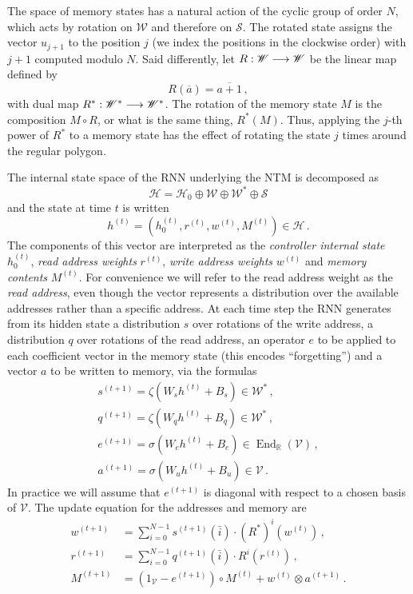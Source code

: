 \documentclass[english,letter paper,12pt,leqno]{article}
\theoremstyle{example}
\numberwithin{equation}{section}
\def\be{\begin{equation}}
\def\ee{\end{equation}}
\DeclareMathOperator{\End}{End}
\begin{document}
The space of memory states has a natural action of the cyclic group of order $N$, which acts by rotation on $\mathscr{W}$ and therefore on $\mathscr{S}$. The rotated state assigns the vector $u_{j+1}$ to the position $j$ (we index the positions in the clockwise order) with $j + 1$ computed modulo $N$. Said differently, let $R: \mathscr{W} \longrightarrow \mathscr{W}$ be the linear map defined by
\[
R( \overline{a} ) = \overline{a+1}\,,
\]
with dual map $R^*: \mathscr{W}^* \longrightarrow \mathscr{W}^*$. The rotation of the memory state $M$ is the composition $M \circ R$, or what is the same thing, $R^*( M )$. Thus, applying the $j$-th power of $R^*$ to a memory state has the effect of rotating the state $j$ times around the regular polygon.

The internal state space of the RNN underlying the NTM is decomposed as
\be\label{eq:decomp}
\mathscr{H} = \mathscr{H}_0 \oplus \mathscr{W} \oplus \mathscr{W}^* \oplus \mathscr{S}
\ee
and the state at time $t$ is written
\[
h^{(t)} = (h_0^{(t)}, r^{(t)}, w^{(t)}, M^{(t)}) \in \mathscr{H}\,.
\]
The components of this vector are interpreted as the \emph{controller internal state} $h_0^{(t)}$, \emph{read address weights} $r^{(t)}$, \emph{write address weights} $w^{(t)}$ and \emph{memory contents} $M^{(t)}$. For convenience we will refer to the read address weight as the \emph{read address}, even though the vector represents a distribution over the available addresses rather than a specific address. At each time step the RNN generates from its hidden state a distribution $s$ over rotations of the write address, a distribution $q$ over rotations of the read address, an operator $e$ to be applied to each coefficient vector in the memory state (this encodes ``forgetting'') and a vector $a$ to be written to memory, via the formulas
\begin{gather*}
s^{(t+1)} = \zeta( W_s h^{(t)} + B_s ) \in \mathscr{W}^*\,,\\
q^{(t+1)} = \zeta( W_q h^{(t)} + B_q ) \in \mathscr{W}^*\,,\\
e^{(t+1)} = \sigma( W_e h^{(t)} + B_e ) \in \End_{\mathbb{R}}(\mathscr{V})\,,\\
a^{(t+1)} = \sigma( W_u h^{(t)} + B_u ) \in \mathscr{V}\,.
\end{gather*}
In practice we will assume that $e^{(t+1)}$ is diagonal with respect to a chosen basis of $\mathscr{V}$. The update equation for the addresses \cite[Eq. (8)]{ntm} and memory \cite[Eq. (3),(4)]{ntm} are
\begin{align}
w^{(t+1)} &= \sum_{i=0}^{N-1} s^{(t+1)}(\bar{i}) \cdot (R^*)^i( w^{(t)} )\,,\label{eq:ntm_update1}
\\
r^{(t+1)} &= \sum_{i=0}^{N-1} q^{(t+1)}(\bar{i}) \cdot R^i( r^{(t)} )\,,\label{eq:ntm_update2}\\
M^{(t+1)} &= (1_{\mathscr{V}} - e^{(t+1)} ) \circ M^{(t)} + w^{(t)} \otimes a^{(t+1)}\,.\label{eq:ntm_update3}
\end{align}
\end{document}
